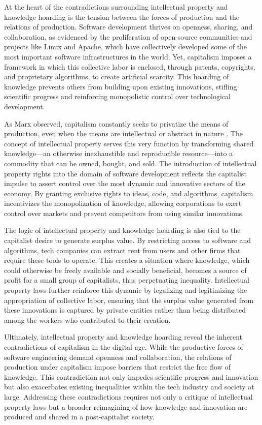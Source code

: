 \begin{refsection}
At the heart of the contradictions surrounding intellectual property and knowledge hoarding is the tension between the forces of production and the relations of production. Software development thrives on openness, sharing, and collaboration, as evidenced by the proliferation of open-source communities and projects like Linux and Apache, which have collectively developed some of the most important software infrastructures in the world. Yet, capitalism imposes a framework in which this collective labor is enclosed, through patents, copyrights, and proprietary algorithms, to create artificial scarcity. This hoarding of knowledge prevents others from building upon existing innovations, stifling scientific progress and reinforcing monopolistic control over technological development.

As Marx observed, capitalism constantly seeks to privatize the means of production, even when the means are intellectual or abstract in nature \cite[pp.~527-529]{marx1867}. The concept of intellectual property serves this very function by transforming shared knowledge—an otherwise inexhaustible and reproducible resource—into a commodity that can be owned, bought, and sold. The introduction of intellectual property rights into the domain of software development reflects the capitalist impulse to assert control over the most dynamic and innovative sectors of the economy. By granting exclusive rights to ideas, code, and algorithms, capitalism incentivizes the monopolization of knowledge, allowing corporations to exert control over markets and prevent competitors from using similar innovations.

The logic of intellectual property and knowledge hoarding is also tied to the capitalist desire to generate surplus value. By restricting access to software and algorithms, tech companies can extract rent from users and other firms that require these tools to operate. This creates a situation where knowledge, which could otherwise be freely available and socially beneficial, becomes a source of profit for a small group of capitalists, thus perpetuating inequality. Intellectual property laws further reinforce this dynamic by legalizing and legitimizing the appropriation of collective labor, ensuring that the surplus value generated from these innovations is captured by private entities rather than being distributed among the workers who contributed to their creation.

Ultimately, intellectual property and knowledge hoarding reveal the inherent contradictions of capitalism in the digital age. While the productive forces of software engineering demand openness and collaboration, the relations of production under capitalism impose barriers that restrict the free flow of knowledge. This contradiction not only impedes scientific progress and innovation but also exacerbates existing inequalities within the tech industry and society at large. Addressing these contradictions requires not only a critique of intellectual property laws but a broader reimagining of how knowledge and innovation are produced and shared in a post-capitalist society.


\end{refsection}
